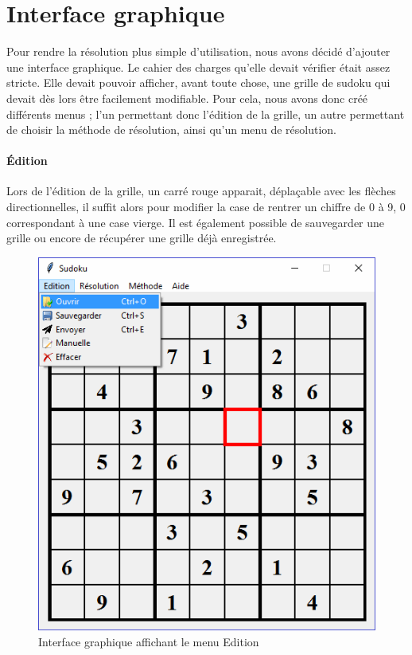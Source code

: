 \documentclass[12pt,a4paper]{report}
\begin{document}
\section{Interface graphique}
Pour rendre la résolution plus simple d'utilisation, nous avons décidé d'ajouter une interface graphique. Le cahier des charges qu'elle devait vérifier était assez stricte. Elle devait pouvoir afficher, avant toute chose, une grille de sudoku qui devait dès lors être facilement modifiable. Pour cela, nous avons donc créé différents menus ; l'un permettant donc l'édition de la grille, un autre permettant de choisir la méthode de résolution, ainsi qu'un menu de résolution. 

\paragraph{Édition} Lors de l'édition de la grille, un carré rouge apparait, déplaçable avec les flèches directionnelles, il suffit alors pour modifier la case de rentrer un chiffre de 0 à 9, 0 correspondant à une case vierge. Il est également possible de sauvegarder une grille ou encore de récupérer une grille déjà enregistrée.

\begin{figure}[!h]
 \center
 \includegraphics[scale=0.55]{../pictures/Sudoku_edition}
 \caption{Interface graphique affichant le menu Edition}
\end{figure}
\newpage
\end{document}
